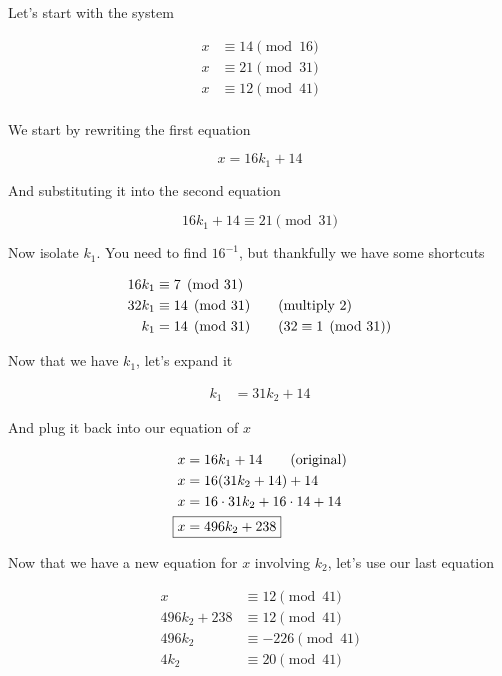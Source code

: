 \documentclass[../../Main.tex]{subfiles}
\begin{document}
\begin{example}
    Let's start with the system

    \begin{align*}
        x &\equiv 14 \pmod{16} \\
        x &\equiv 21 \pmod{31} \\
        x &\equiv 12 \pmod{41} \\
    \end{align*}

    We start by rewriting the first equation

    $$x = 16k_1 + 14$$

    And substituting it into the second equation

    $$16k_1 + 14 \equiv 21 \pmod{31}$$

    Now isolate $k_1$. You need to find $16^{-1}$, but thankfully we have some shortcuts

    \begin{align*}
        16k_1 &\equiv 7 \pmod{31} \\
        32k_1 &\equiv 14 \pmod{31} \tag{multiply 2} \\
        k_1 &= 14 \pmod{31} \tag{$32 \equiv 1 \pmod{31}$} \\
    \end{align*}

    Now that we have $k_1$, let's expand it 

    \begin{align*}
        k_1 &= 31k_2 + 14
    \end{align*}

    And plug it back into our equation of $x$

    \begin{align*}
        x &= 16k_1 + 14 \tag{original} \\
        x &= 16(31k_2 + 14) + 14 \\
        x &= 16 \cdot 31k_2 + 16 \cdot 14 + 14 \\
        \Aboxed{x &= 496 k_2 + 238} \\
    \end{align*}

    Now that we have a new equation for $x$ involving $k_2$, let's use our last equation

    \begin{align*}
        x &\equiv 12 \pmod{41} \tag{last equation} \\
        496k_2 + 238 &\equiv 12 \pmod{41} \\
        496k_2 &\equiv -226 \pmod{41} \\
        4k_2 &\equiv 20 \pmod{41} \tag{reduce 496 and -226} \\
    \end{align*}


\end{example}
\end{document}

